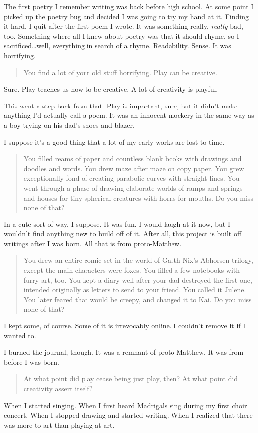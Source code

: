 The first poetry I remember writing was back before high school. At some point I picked up the poetry bug and decided I was going to try my hand at it. Finding it hard, I quit after the first poem I wrote. It was something really, \emph{really} bad, too. Something where all I knew about poetry was that it should rhyme, so I sacrificed\ldots{}well, everything in search of a rhyme. Readability. Sense. It was horrifying.

\begin{quote}
You find a lot of your old stuff horrifying. Play can be creative.
\end{quote}

Sure. Play teaches us how to be creative. A lot of creativity is playful.

This went a step back from that. Play is important, sure, but it didn't make anything I'd actually call a poem. It was an innocent mockery in the same way as a boy trying on his dad's shoes and blazer.

I suppose it's a good thing that a lot of my early works are lost to time.

\begin{quote}
You filled reams of paper and countless blank books with drawings and doodles and words. You drew maze after maze on copy paper. You grew exceptionally fond of creating parabolic curves with straight lines. You went through a phase of drawing elaborate worlds of ramps and springs and houses for tiny spherical creatures with horns for mouths. Do you miss none of that?
\end{quote}

In a cute sort of way, I suppose. It was fun. I would laugh at it now, but I wouldn't find anything new to build off of it. After all, this project is built off writings after I was born. All that is from proto-Matthew.

\begin{quote}
You drew an entire comic set in the world of Garth Nix's Abhorsen trilogy, except the main characters were foxes. You filled a few notebooks with furry art, too. You kept a diary well after your dad destroyed the first one, intended originally as letters to send to your friend. You called it Julene. You later feared that would be creepy, and changed it to Kai. Do you miss none of that?
\end{quote}

I kept some, of course. Some of it is irrevocably online. I couldn't remove it if I wanted to.

I burned the journal, though. It was a remnant of proto-Matthew. It was from before I was born.

\begin{quote}
At what point did play cease being just play, then? At what point did creativity assert itself?
\end{quote}

When I started singing. When I first heard Madrigals sing during my first choir concert. When I stopped drawing and started writing. When I realized that there was more to art than playing at art.
